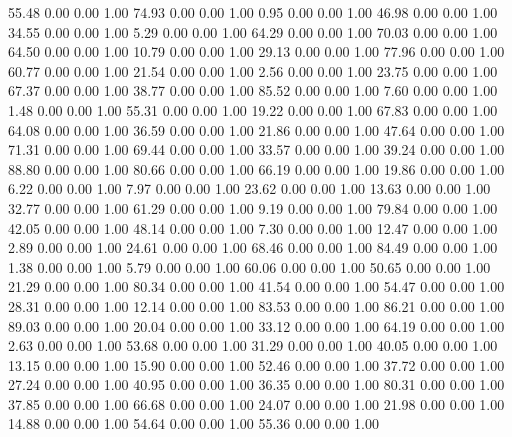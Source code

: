    55.48   0.00   0.00   1.00
   74.93   0.00   0.00   1.00
    0.95   0.00   0.00   1.00
   46.98   0.00   0.00   1.00
   34.55   0.00   0.00   1.00
    5.29   0.00   0.00   1.00
   64.29   0.00   0.00   1.00
   70.03   0.00   0.00   1.00
   64.50   0.00   0.00   1.00
   10.79   0.00   0.00   1.00
   29.13   0.00   0.00   1.00
   77.96   0.00   0.00   1.00
   60.77   0.00   0.00   1.00
   21.54   0.00   0.00   1.00
    2.56   0.00   0.00   1.00
   23.75   0.00   0.00   1.00
   67.37   0.00   0.00   1.00
   38.77   0.00   0.00   1.00
   85.52   0.00   0.00   1.00
    7.60   0.00   0.00   1.00
    1.48   0.00   0.00   1.00
   55.31   0.00   0.00   1.00
   19.22   0.00   0.00   1.00
   67.83   0.00   0.00   1.00
   64.08   0.00   0.00   1.00
   36.59   0.00   0.00   1.00
   21.86   0.00   0.00   1.00
   47.64   0.00   0.00   1.00
   71.31   0.00   0.00   1.00
   69.44   0.00   0.00   1.00
   33.57   0.00   0.00   1.00
   39.24   0.00   0.00   1.00
   88.80   0.00   0.00   1.00
   80.66   0.00   0.00   1.00
   66.19   0.00   0.00   1.00
   19.86   0.00   0.00   1.00
    6.22   0.00   0.00   1.00
    7.97   0.00   0.00   1.00
   23.62   0.00   0.00   1.00
   13.63   0.00   0.00   1.00
   32.77   0.00   0.00   1.00
   61.29   0.00   0.00   1.00
    9.19   0.00   0.00   1.00
   79.84   0.00   0.00   1.00
   42.05   0.00   0.00   1.00
   48.14   0.00   0.00   1.00
    7.30   0.00   0.00   1.00
   12.47   0.00   0.00   1.00
    2.89   0.00   0.00   1.00
   24.61   0.00   0.00   1.00
   68.46   0.00   0.00   1.00
   84.49   0.00   0.00   1.00
    1.38   0.00   0.00   1.00
    5.79   0.00   0.00   1.00
   60.06   0.00   0.00   1.00
   50.65   0.00   0.00   1.00
   21.29   0.00   0.00   1.00
   80.34   0.00   0.00   1.00
   41.54   0.00   0.00   1.00
   54.47   0.00   0.00   1.00
   28.31   0.00   0.00   1.00
   12.14   0.00   0.00   1.00
   83.53   0.00   0.00   1.00
   86.21   0.00   0.00   1.00
   89.03   0.00   0.00   1.00
   20.04   0.00   0.00   1.00
   33.12   0.00   0.00   1.00
   64.19   0.00   0.00   1.00
    2.63   0.00   0.00   1.00
   53.68   0.00   0.00   1.00
   31.29   0.00   0.00   1.00
   40.05   0.00   0.00   1.00
   13.15   0.00   0.00   1.00
   15.90   0.00   0.00   1.00
   52.46   0.00   0.00   1.00
   37.72   0.00   0.00   1.00
   27.24   0.00   0.00   1.00
   40.95   0.00   0.00   1.00
   36.35   0.00   0.00   1.00
   80.31   0.00   0.00   1.00
   37.85   0.00   0.00   1.00
   66.68   0.00   0.00   1.00
   24.07   0.00   0.00   1.00
   21.98   0.00   0.00   1.00
   14.88   0.00   0.00   1.00
   54.64   0.00   0.00   1.00
   55.36   0.00   0.00   1.00
